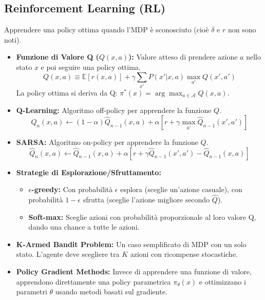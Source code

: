 \documentclass[a4paper,11pt]{article}
\begin{document}
\subsection{Reinforcement Learning (RL)}
Apprendere una policy ottima quando l'MDP è sconosciuto (cioè $\delta$ e $r$ non sono noti).
\begin{itemize}
    \item \textbf{Funzione di Valore Q ($Q(x, a)$):} Valore atteso di prendere azione $a$ nello stato $x$ e poi seguire una policy ottima.
    \begin{equation}
        Q(x, a) \equiv \mathbb{E}[r(x, a)] + \gamma \sum_{x'} P(x' | x, a) \max_{a'} Q(x', a')
    \end{equation}
    La policy ottima si deriva da Q: $\pi^*(x) = \arg\max_{a \in \mathcal{A}} Q(x, a)$.
    \item \textbf{Q-Learning:} Algoritmo off-policy per apprendere la funzione $Q$.
    \begin{equation}
        \hat{Q}_n(x, a) \leftarrow (1 - \alpha)\hat{Q}_{n-1}(x, a) + \alpha \left[ r + \gamma \max_{a'} \hat{Q}_{n-1}(x', a') \right]
    \end{equation}
    \item \textbf{SARSA:} Algoritmo on-policy per apprendere la funzione $Q$.
    \begin{equation}
        \hat{Q}_n(x, a) \leftarrow \hat{Q}_{n-1}(x, a) + \alpha \left[ r + \gamma \hat{Q}_{n-1}(x', a') - \hat{Q}_{n-1}(x, a) \right]
    \end{equation}
    \item \textbf{Strategie di Esplorazione/Sfruttamento:}
    \begin{itemize}
        \item \textbf{$\epsilon$-greedy:} Con probabilità $\epsilon$ esplora (sceglie un'azione casuale), con probabilità $1-\epsilon$ sfrutta (sceglie l'azione migliore secondo $\hat{Q}$).
        \item \textbf{Soft-max:} Sceglie azioni con probabilità proporzionale al loro valore Q, dando una chance a tutte le azioni.
    \end{itemize}
    \item \textbf{K-Armed Bandit Problem:} Un caso semplificato di MDP con un solo stato. L'agente deve scegliere tra $K$ azioni con ricompense stocastiche.
    \item \textbf{Policy Gradient Methods:} Invece di apprendere una funzione di valore, apprendono direttamente una policy parametrica $\pi_\theta(x)$ e ottimizzano i parametri $\theta$ usando metodi basati sul gradiente.

\end{itemize}
\end{document}
